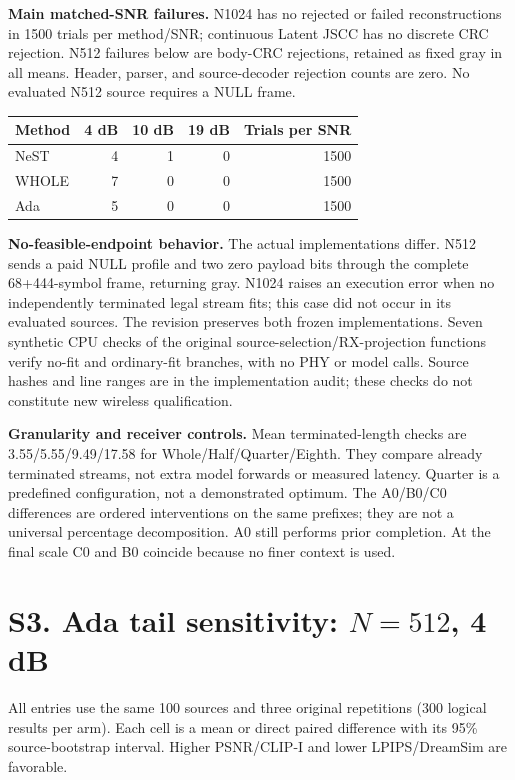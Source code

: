 \documentclass[11pt,letterpaper]{article}
\begin{document}
\textbf{Main matched-SNR failures.} N1024 has no rejected or failed reconstructions in 1500 trials per method/SNR; continuous Latent JSCC has no discrete CRC rejection. N512 failures below are body-CRC rejections, retained as fixed gray in all means. Header, parser, and source-decoder rejection counts are zero. No evaluated N512 source requires a NULL frame.
\begin{center}\begin{tabular}{lrrrr}\toprule
Method & 4 dB & 10 dB & 19 dB & Trials per SNR\\\midrule
NeST & 4 & 1 & 0 & 1500\\
WHOLE & 7 & 0 & 0 & 1500\\
Ada & 5 & 0 & 0 & 1500\\\bottomrule
\end{tabular}\end{center}
\textbf{No-feasible-endpoint behavior.} The actual implementations differ. N512 sends a paid NULL profile and two zero payload bits through the complete 68+444-symbol frame, returning gray. N1024 raises an execution error when no independently terminated legal stream fits; this case did not occur in its evaluated sources. The revision preserves both frozen implementations. Seven synthetic CPU checks of the original source-selection/RX-projection functions verify no-fit and ordinary-fit branches, with no PHY or model calls. Source hashes and line ranges are in the implementation audit; these checks do not constitute new wireless qualification.

\textbf{Granularity and receiver controls.} Mean terminated-length checks are 3.55/5.55/9.49/17.58 for Whole/Half/Quarter/Eighth. They compare already terminated streams, not extra model forwards or measured latency. Quarter is a predefined configuration, not a demonstrated optimum. The A0/B0/C0 differences are ordered interventions on the same prefixes; they are not a universal percentage decomposition. A0 still performs prior completion. At the final scale C0 and B0 coincide because no finer context is used.

\clearpage\section*{S3. Ada tail sensitivity: $N=512$, 4 dB}
All entries use the same 100 sources and three original repetitions (300 logical results per arm). Each cell is a mean or direct paired difference with its 95\% source-bootstrap interval. Higher PSNR/CLIP-I and lower LPIPS/DreamSim are favorable.
\end{document}
